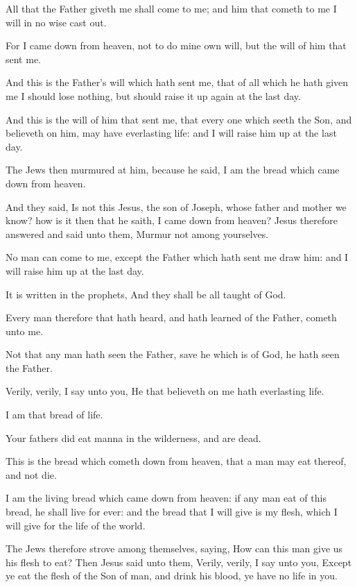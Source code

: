 \verse All that the Father giveth me shall come to me; and him that cometh to me I will in no wise cast out.

\verse For I came down from heaven, not to do mine own will, but the will of him that sent me.

\verse And this is the Father's will which hath sent me, that of all which he hath given me I should lose nothing, but should raise it up again at the last day.

\verse And this is the will of him that sent me, that every one which seeth the Son, and believeth on him, may have everlasting life: and I will raise him up at the last day.

\verse The Jews then murmured at him, because he said, I am the bread which came down from heaven.

\verse And they said, Is not this Jesus, the son of Joseph, whose father and mother we know? how is it then that he saith, I came down from heaven?  \verse Jesus therefore answered and said unto them, Murmur not among yourselves.

\verse No man can come to me, except the Father which hath sent me draw him: and I will raise him up at the last day.

\verse It is written in the prophets, And they shall be all taught of God.

Every man therefore that hath heard, and hath learned of the Father, cometh unto me.

\verse Not that any man hath seen the Father, save he which is of God, he hath seen the Father.

\verse Verily, verily, I say unto you, He that believeth on me hath everlasting life.

\verse I am that bread of life.

\verse Your fathers did eat manna in the wilderness, and are dead.

\verse This is the bread which cometh down from heaven, that a man may eat thereof, and not die.

\verse I am the living bread which came down from heaven: if any man eat of this bread, he shall live for ever: and the bread that I will give is my flesh, which I will give for the life of the world.

\verse The Jews therefore strove among themselves, saying, How can this man give us his flesh to eat?  \verse Then Jesus said unto them, Verily, verily, I say unto you, Except ye eat the flesh of the Son of man, and drink his blood, ye have no life in you.

